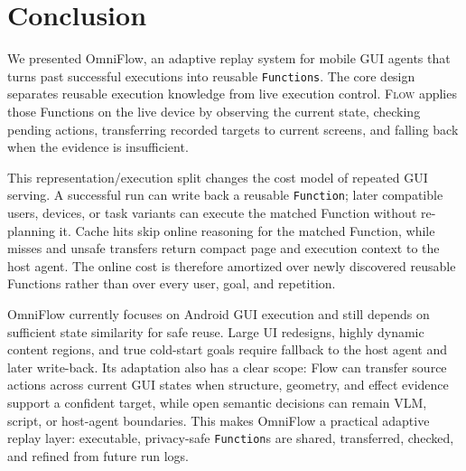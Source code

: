 
\section{Conclusion}
\label{sec:conclusion}

We presented OmniFlow, an adaptive replay system for mobile GUI agents that
turns past successful executions into reusable \texttt{Functions}.
The core design separates reusable execution knowledge from live execution
control.   \textsc{Flow} applies those Functions
on the live device by observing the current state, checking pending actions,
transferring recorded targets to current screens, and falling back when the
evidence is insufficient.

This representation/execution split changes the cost model of repeated GUI serving.  A
successful run can write back a reusable \texttt{Function}; later compatible
users, devices, or task variants can execute the matched Function without
re-planning it.  Cache hits skip online reasoning for the matched Function,
while misses and unsafe transfers return compact page and execution context to
the host agent.  The online cost is therefore amortized over newly discovered
reusable Functions rather than over every user, goal, and repetition.

OmniFlow currently focuses on Android GUI execution and still depends on
sufficient state similarity for safe reuse.  Large UI redesigns, highly dynamic
content regions, and true cold-start goals require fallback to the host agent
and later write-back.  Its adaptation also has a clear scope: Flow can transfer
source actions across current GUI states when structure, geometry, and effect
evidence support a confident target, while open semantic decisions can remain
VLM, script, or host-agent boundaries.  This makes OmniFlow a practical
adaptive replay layer: executable, privacy-safe \texttt{Function}s are shared,
transferred, checked, and refined from future run logs.
